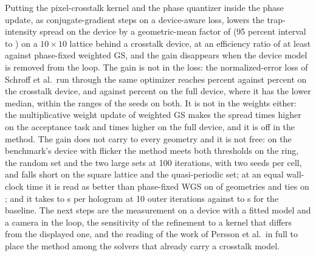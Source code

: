 Putting the pixel-crosstalk kernel and the phase quantizer inside the phase update, as conjugate-gradient steps on a device-aware loss, lowers the trap-intensity spread on the device by a geometric-mean factor of \ratioOneGm{} (95 percent interval \ratioOneCiLo{} to \ratioOneCiHi{}) on a $10\times10$ lattice behind a crosstalk device, at an efficiency ratio of at least \effRatioOneMin{} against phase-fixed weighted GS, and the gain disappears when the device model is removed from the loop. The gain is not in the loss: the normalized-error loss of Schroff et al.\ run through the same optimizer reaches \schroffXSig{} percent against \ablBFullSig{} percent on the crosstalk device, and \schroffFSig{} against \ablBFFullSig{} percent on the full device, where it has the lower median, within the ranges of the seeds on both. It is not in the weights either: the multiplicative weight update of weighted GS makes the spread \ablBWeightsRatio{} times higher on the acceptance task and \ablBFWeightsRatio{} times higher on the full device, and it is off in the method. The gain does not carry to every geometry and it is not free: on the benchmark's device with flicker the method meets both thresholds on the ring, the random set and the two large sets at 100 iterations, with two seeds per cell, and falls short on the square lattice and the quasi-periodic set; at an equal wall-clock time it is read as better than phase-fixed WGS on \benchOneDevTimeProposed{} of \benchOneDevCells{} geometries and ties on \benchOneDevTimeTie{}; and it takes \benchTenSecRefMin{} to \benchTenSecRefMax{} s per hologram at 10 outer iterations against \benchTenSecMsevenMin{} to \benchTenSecMsevenMax{} s for the baseline.
The next steps are the measurement on a device with a fitted model and a camera in the loop, the sensitivity of the refinement to a kernel that differs from the displayed one, and the reading of the work of Persson et al.\ in full to place the method among the solvers that already carry a crosstalk model.
